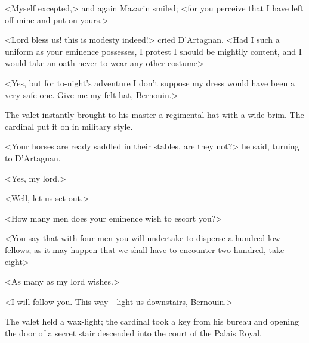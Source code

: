 <Myself excepted,> and again Mazarin smiled; <for you perceive that I have left off mine and put on yours.>

<Lord bless us! this is modesty indeed!> cried D'Artagnan. <Had I such a uniform as your eminence possesses, I protest I should be mightily content, and I would take an oath never to wear any other costume\longdash>

<Yes, but for to-night's adventure I don't suppose my dress would have been a very safe one. Give me my felt hat, Bernouin.>

The valet instantly brought to his master a regimental hat with a wide brim. The cardinal put it on in military style.

<Your horses are ready saddled in their stables, are they not?> he said, turning to D'Artagnan.

<Yes, my lord.>

<Well, let us set out.>

<How many men does your eminence wish to escort you?>

<You say that with four men you will undertake to disperse a hundred low fellows; as it may happen that we shall have to encounter two hundred, take eight\longdash>

<As many as my lord wishes.>

<I will follow you. This way—light us downstairs, Bernouin.>

The valet held a wax-light; the cardinal took a key from his bureau and opening the door of a secret stair descended into the court of the Palais Royal. 
